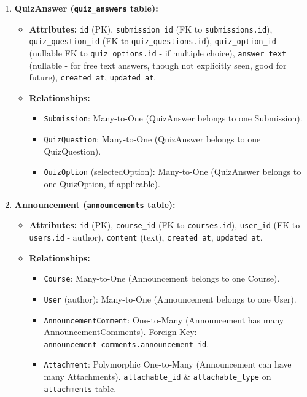 \begin{enumerate}
\begin{itemize}
\begin{itemize}
        \end{itemize}
    \end{itemize}
    \item \textbf{QuizAnswer (\texttt{quiz\_answers} table):}
    \begin{itemize}
        \item \textbf{Attributes:} \texttt{id} (PK), \texttt{submission\_id} (FK to \texttt{submissions.id}), \texttt{quiz\_question\_id} (FK to \texttt{quiz\_questions.id}), \texttt{quiz\_option\_id} (nullable FK to \texttt{quiz\_options.id} - if multiple choice), \texttt{answer\_text} (nullable - for free text answers, though not explicitly seen, good for future), \texttt{created\_at}, \texttt{updated\_at}.
        \item \textbf{Relationships:}
        \begin{itemize}
            \item \texttt{Submission}: Many-to-One (QuizAnswer belongs to one Submission).
            \item \texttt{QuizQuestion}: Many-to-One (QuizAnswer belongs to one QuizQuestion).
            \item \texttt{QuizOption} (selectedOption): Many-to-One (QuizAnswer belongs to one QuizOption, if applicable).
        \end{itemize}
    \end{itemize}
    \item \textbf{Announcement (\texttt{announcements} table):}
    \begin{itemize}
        \item \textbf{Attributes:} \texttt{id} (PK), \texttt{course\_id} (FK to \texttt{courses.id}), \texttt{user\_id} (FK to \texttt{users.id} - author), \texttt{content} (text), \texttt{created\_at}, \texttt{updated\_at}.
        \item \textbf{Relationships:}
        \begin{itemize}
            \item \texttt{Course}: Many-to-One (Announcement belongs to one Course).
            \item \texttt{User} (author): Many-to-One (Announcement belongs to one User).
            \item \texttt{AnnouncementComment}: One-to-Many (Announcement has many AnnouncementComments). Foreign Key: \texttt{announcement\_comments.announcement\_id}.
            \item \texttt{Attachment}: Polymorphic One-to-Many (Announcement can have many Attachments). \texttt{attachable\_id} \& \texttt{attachable\_type} on \texttt{attachments} table.

\end{itemize}
\end{itemize}
\end{enumerate}
